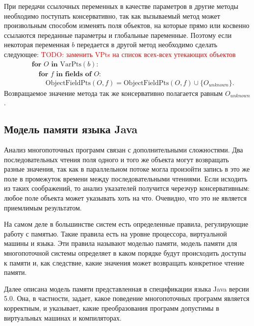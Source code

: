 \documentclass[14pt,titlepage]{extarticle}
\newcommand{\VPts}[1]{\textrm{VarPts}(#1)}
\newcommand{\OFPts}[2]{\textrm{ObjectFieldPts}(#1, #2)}
\newcommand{\todo}[1]{\textcolor{red}{TODO: #1}}
\begin{document}
      При передачи ссылочных переменных в качестве параметров в другие
      методы необходимо поступать консервативно, так как вызываемый метод
      может произвольным способом изменять поля объектов, на которые прямо или
      косвенно ссылаются переданные параметры и глобальные паременные. Поэтому
      если некоторая переменная $b$ передается в другой метод необходимо
      сделать следующее:
      \todo{заменить VPts на список всех-всех утекающих объектов}
      \begin{eqnarray*}
        &&\textbf{for } O \textbf{ in } \VPts{b} \colon \\
        &&\quad\textbf{for } f \textbf{ in fields of } O \colon \\
        &&\qquad\OFPts{O}{f} = \OFPts{O}{f} \cup \{O_{unknown}\}.
      \end{eqnarray*}
      Возвращаемое значение метода так же консервативно полагается равным
      $O_{unknown}$.

    \subsection{Модель памяти языка Java}

      Анализ многопоточных программ связан с дополнительными сложностями.
      Два последовательных чтения поля одного и того же объекта могут
      возвращать разные значения, так как в параллельном потоке могла произойти
      запись в это же поле в промежуток времени между последовательными
      чтениями. Если исходить из таких соображений, то анализ указателей
      получится черезчур консервативным: любое поле объекта может указывать
      хоть на что. Очевидно, что это не является приемлимым результатом.

      На самом деле в большинстве систем есть определенные правила,
      регулирующие работу с памятью. Такие правила есть на уровне процессора,
      виртуальной машины и языка. Эти правила называют моделью памяти,
      модель памяти для многопоточной системы определяет в каком
      порядке будут происходить доступы к памяти и, как следствие, какие
      значения может возвращать конкретное чтение памяти.

      Далее описана модель памяти представленная в спецификации языка Java
      версии 5.0. Она, в частности, задает, какое поведение многопоточных
      программ является корректным, и указывает, какие преобразования программ
      допустимы в виртуальных машинах и компиляторах.
\end{document}
